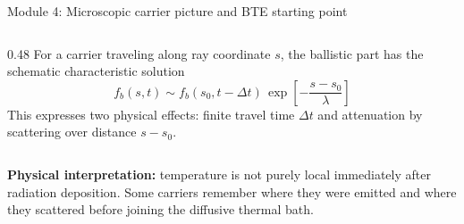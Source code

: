 \documentclass[aspectratio=169,9pt]{beamer}
\newcommand{\mfp}{\lambda}
\begin{document}
\begin{frame}{Module 4: Microscopic carrier picture and BTE starting point}
\begin{columns}[T,totalwidth=\textwidth]
\begin{column}{0.48\textwidth}
\vspace{1mm}
For a carrier traveling along ray coordinate \(s\), the ballistic part has the schematic characteristic solution
\begin{equation*}
\boxed{f_b(s,t)\sim f_b(s_0,t-\Delta t)\,
\exp\!\left[-\frac{s-s_0}{\mfp}\right]}
\end{equation*}
\small
This expresses two physical effects: finite travel time \(\Delta t\) and attenuation by scattering over distance \(s-s_0\).
\end{column}
\end{columns}

\vspace{1mm}
\begin{purplebox}
\centering\scriptsize
\textbf{Physical interpretation:} temperature is not purely local immediately after radiation deposition.  Some carriers remember where they were emitted and where they scattered before joining the diffusive thermal bath.
\end{purplebox}
\end{frame}
\end{document}
